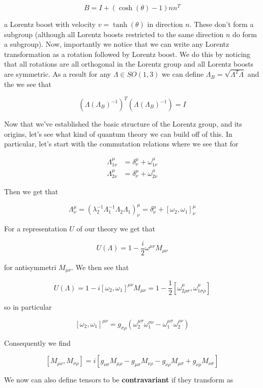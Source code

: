 \documentclass{article}
\theoremstyle{definition}
\begin{document}
$$ B = I + (\cosh(\theta) - 1) n n^T $$

a Lorentz boost with velocity $v = \tanh(\theta)$ in direction $n$. These don't
form a subgroup (although all Lorentz boosts restricted to the same direction
$n$ do form a subgroup). Now, importantly we notice that we can write any
Lorentz transformation as a rotation followed by Lorentz boost. We do this by
noticing that all rotations are all orthogonal in the Lorentz group and all
Lorentz boosts are symmetric. As a result for any $\Lambda \in SO(1, 3)$ we can
define $\Lambda_B = \sqrt{\Lambda^T \Lambda}$ and the we see that

$$ (\Lambda(\Lambda_B)^{-1})^T (\Lambda (\Lambda_B)^{-1}) = I $$

Now that we've established the basic structure of the Lorentz group, and its
origins, let's see what kind of quantum theory we can build off of this. In
particular, let's start with the commutation relations where we see that for

\begin{align*}
\Lambda^\mu_{1\nu} &= \delta^\mu_\nu + \omega^\mu_{1\nu} \\
\Lambda^\mu_{2\nu} &= \delta^\mu_\nu + \omega^\mu_{2\nu} 
\end{align*}

Then we get that

$$ \Lambda^\mu_\nu = (\lambda_2^{-1} \Lambda_1^{-1} \Lambda_2 \Lambda_1)^\mu_\nu
= \delta^\mu_\nu + [\omega_2, \omega_1]^\mu_\nu $$

For a representation $U$ of our theory we get that

$$ U(\Lambda) = 1 - \frac{i}{2} \omega^{\mu \nu} M_{\mu \nu} $$

for antisymmetri $M_{\mu \nu}$. We then see that

$$ U(\Lambda) = 1 - i[\omega_2, \omega_1]^{\mu \nu} M_{\mu \nu} = 1 -
\frac{1}{2} [\omega^\mu_{2 \rho \sigma}, \omega^\mu_{1\sigma \rho}] $$

so in particular

$$ [\omega_2, \omega_1]^{\mu \nu} = g_{\sigma \rho}(\omega_2^{\mu \sigma}
\omega_1^{\sigma \nu} - \omega_1^{\mu \sigma} \omega_2^{\rho \nu}) $$

Consequently we find

$$ [M_{\mu \nu}, M_{\sigma \rho}] = i [g_{\nu \sigma} M_{\mu \rho} - g_{\mu
  \sigma} M_{\nu \rho} - g_{\nu \rho} M_{\mu \sigma} + g_{\nu \rho} M_{\nu
  \sigma}] $$

We now can also define tensors to be \textbf{contravariant} if they transform
as
\end{document}
